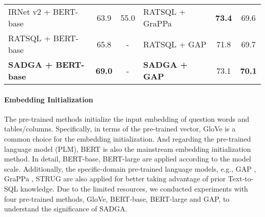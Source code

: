 \documentclass{article}
\begin{document}
\begin{table*}[hbt]
\begin{tabular}{lcc|lcc}
        IRNet v2 + BERT-base \citep{guo2019towards}                  & 63.9                          & 55.0          
        & RATSQL + GraPPa \citep{yu2021grappa}                      & \textbf{73.4}                 & 69.6          \\
        
        RATSQL + BERT-base \citep{wang2020rat}                      & 65.8                          & -             
        & RATSQL + GAP \citep{shi2021learning}                      & 71.8                          & 69.7          \\
        
        \textbf{SADGA + BERT-base}                                    & \textbf{69.0}                 & -             
        & \textbf{SADGA + GAP}                                        & 73.1                          & \textbf{70.1}           \\
        \bottomrule
    \end{tabular}
\end{table*}

\paragraph{Embedding Initialization}
The pre-trained methods initialize the input embedding of question words and tables/columns. Specifically, in terms of the pre-trained vector, GloVe \citep{pennington2014glove} is a common choice for the embedding initialization. And regarding the pre-trained language model (PLM), BERT \citep{devlin2018bert} is also the mainstream embedding initialization method. In detail, BERT-base, BERT-large are applied according to the model scale. Additionally, the specific-domain pre-trained language models, e.g., GAP \citep{shi2021learning}, GraPPa \citep{yu2021grappa}, STRUG \citep{deng2021structure} are also applied for better taking advantage of prior Text-to-SQL knowledge. Due to the limited resources, we conducted experiments with four pre-trained methods, GloVe, BERT-base, BERT-large and GAP, to understand the significance of SADGA.
\end{document}
